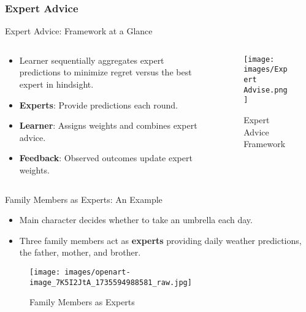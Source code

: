 \documentclass{beamer}
\begin{document}
\subsubsection{Expert Advice}
\begin{frame}{Expert Advice: Framework at a Glance}
  \begin{columns}
    \begin{column}{0.6\textwidth}
      \begin{itemize}
        \item Learner sequentially aggregates expert predictions to minimize regret versus the best expert in hindsight.
        \item \textbf{Experts}: Provide predictions each round.
        \item \textbf{Learner}: Assigns weights and combines expert advice.
        \item \textbf{Feedback}: Observed outcomes update expert weights.
      \end{itemize}
    \end{column}
    \begin{column}{0.4\textwidth}
      \begin{figure}
        \centering
        \texttt{[image: images/Expert Advise.png]}
        \caption{Expert Advice Framework}
      \end{figure}
    \end{column}
  \end{columns}
\end{frame}


\begin{frame}{Family Members as Experts: An Example}
  \begin{itemize}
    \item Main character decides whether to take an umbrella each day.
    \item Three family members act as \textbf{experts} providing daily weather predictions, the father, mother, and brother.
  \end{itemize}
  \begin{figure}
    \centering
    \texttt{[image: images/openart-image\_7K5I2JtA\_1735594988581\_raw.jpg]}
    \caption{Family Members as Experts}
  \end{figure}
\end{frame}
\end{document}
